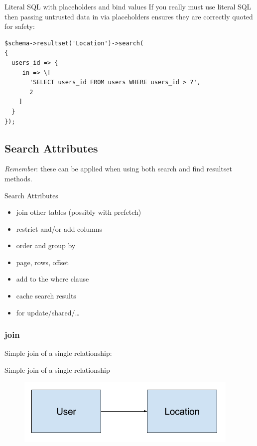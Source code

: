 \begin{frame}[fragile]{Literal SQL with placeholders and bind values}
If you really must use literal SQL then passing untrusted data in via placeholders ensures they are correctly quoted for safety:

\begin{lstlisting}
$schema->resultset('Location')->search(
{
  users_id => {
    -in => \[
       'SELECT users_id FROM users WHERE users_id > ?',
       2
    ]
  }
});
\end{lstlisting}
\end{frame}

\subsection{Search Attributes}

\emph{Remember}: these can be applied when using both search and find resultset
methods.

\begin{frame}{Search Attributes}
\begin{itemize}
\item join other tables (possibly with prefetch)
\item restrict and/or add columns
\item order and group by
\item page, rows, offset
\item add to the where clause
\item cache search results
\item for update/shared/…
\end{itemize}
\end{frame}

\subsubsection{join}

Simple join of a single relationship:

\begin{frame}[fragile]{Simple join of a single relationship}

\begin{figure}[!ht]
\centering
\includegraphics[width=1\linewidth]{img/join-simple.png}
\end{figure}

\end{frame}


